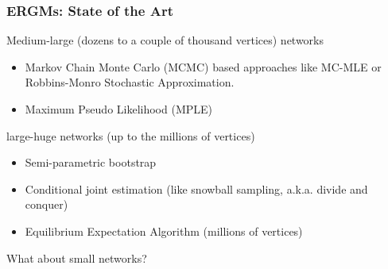 \documentclass[aspectratio=169, 9pt]{beamer}\usepackage[]{graphicx}\usepackage[]{color}
\begin{document}
\begin{frame}[label=art]
\frametitle{ERGMs: State of the Art}
\pause
Medium-large (dozens to a couple of thousand vertices) networks

\begin{itemize}
\item Markov Chain Monte Carlo (MCMC) based approaches like MC-MLE or Robbins-Monro Stochastic Approximation. \hyperlink{mcmle}{}
\item Maximum Pseudo Likelihood (MPLE)
\end{itemize}\pause

large-huge networks (up to the millions of vertices)

\begin{itemize}
\item Semi-parametric bootstrap
\item Conditional joint estimation (like snowball sampling, a.k.a. divide and conquer)
\item Equilibrium Expectation Algorithm (millions of vertices)
\end{itemize}\pause

What about small networks?

\end{frame}
\end{document}
